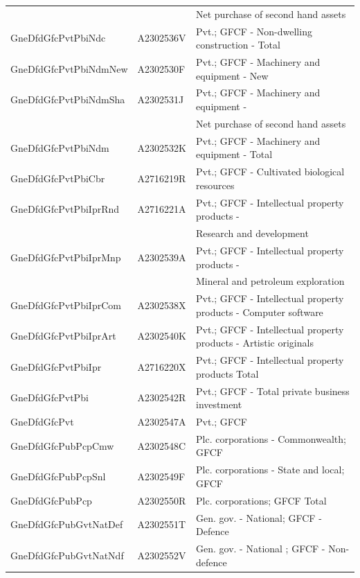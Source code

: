 \documentclass[graybox]{svmult}
\begin{document}
\begin{table}
\begin{tabular*}{\columnwidth}[width = \textwidth]{lll}
                          &           & Net purchase of second hand \vphantom{1} assets\\
		\addlinespace
    GneDfdGfcPvtPbiNdc    & A2302536V & Pvt.; GFCF - Non-dwelling construction - Total\\
    GneDfdGfcPvtPbiNdmNew & A2302530F & Pvt.; GFCF - Machinery and equipment - New\\
    GneDfdGfcPvtPbiNdmSha & A2302531J & Pvt.; GFCF - Machinery and equipment -\\
                          &           & Net purchase of second hand assets\\
    GneDfdGfcPvtPbiNdm    & A2302532K & Pvt.; GFCF - Machinery and equipment - Total\\
		\addlinespace
    GneDfdGfcPvtPbiCbr    & A2716219R & Pvt.; GFCF - Cultivated biological resources\\
    GneDfdGfcPvtPbiIprRnd & A2716221A & Pvt.; GFCF - Intellectual property products -\\
                          &           & Research and development\\
    GneDfdGfcPvtPbiIprMnp & A2302539A & Pvt.; GFCF - Intellectual property products -\\
                          &           & Mineral and petroleum exploration\\
		\addlinespace
    GneDfdGfcPvtPbiIprCom & A2302538X & Pvt.; GFCF - Intellectual property products - Computer software\\
    GneDfdGfcPvtPbiIprArt & A2302540K & Pvt.; GFCF - Intellectual property products - Artistic originals\\
    GneDfdGfcPvtPbiIpr    & A2716220X & Pvt.; GFCF - Intellectual property products Total\\
    GneDfdGfcPvtPbi       & A2302542R & Pvt.;  GFCF - Total private business investment\\
    GneDfdGfcPvt          & A2302547A & Pvt.; GFCF\\
		\addlinespace
    GneDfdGfcPubPcpCmw    & A2302548C & Plc. corporations - Commonwealth; GFCF\\
    GneDfdGfcPubPcpSnl    & A2302549F & Plc. corporations - State and local; GFCF\\
    GneDfdGfcPubPcp       & A2302550R & Plc. corporations; GFCF Total\\
    GneDfdGfcPubGvtNatDef & A2302551T & Gen. gov. - National; GFCF - Defence\\
    GneDfdGfcPubGvtNatNdf & A2302552V & Gen. gov. - National ; GFCF - Non-defence\\

\end{tabular*}
\end{table}
\end{document}
